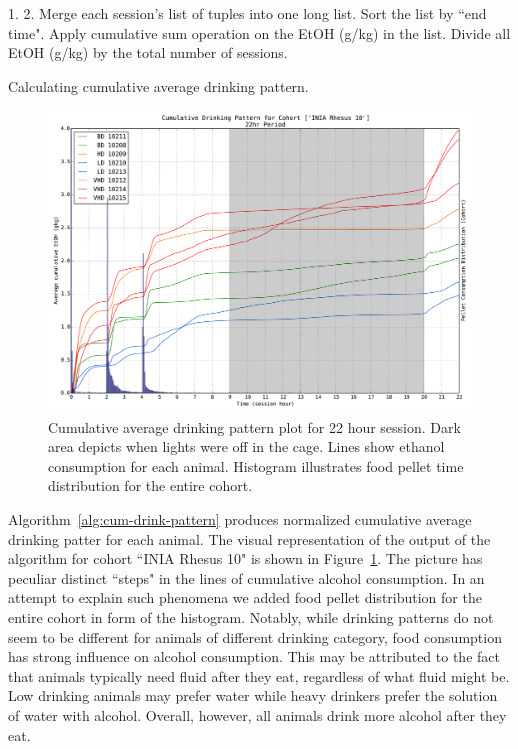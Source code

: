 	\begin{algorithm}[H]	%
		1. 
		2. Merge each session's list of tuples into one long list. Sort the list by ``end time". Apply cumulative sum operation on the EtOH (g/kg) in the list. Divide all EtOH (g/kg) by the total number of sessions.
	\caption{Calculating cumulative average drinking pattern.}
	\label{alg:cum-drink-pattern}
	\end{algorithm}
	
	\begin{figure}[ht]
		\centering
		\includegraphics[width=\linewidth]{figures/dp_r10_m_22hr.pdf}
		\caption{Cumulative average drinking pattern plot for 22 hour session. Dark area depicts when lights were off in the cage. Lines show ethanol consumption for each animal. Histogram illustrates food pellet time distribution for the entire cohort.}
		\label{fig:dp-22hr}
	\end{figure}
		
	Algorithm~\ref{alg:cum-drink-pattern} produces normalized cumulative average drinking patter for each animal. The visual representation of the output of the algorithm for cohort ``INIA Rhesus 10" is shown in Figure~\ref{fig:dp-22hr}. The picture has peculiar distinct ``steps" in the lines of cumulative alcohol consumption. In an attempt to explain such phenomena we added food pellet distribution for the entire cohort in form of the histogram. Notably, while drinking patterns do not seem to be different for animals of different drinking category, food consumption has strong influence on alcohol consumption. This may be attributed to the fact that animals typically need fluid after they eat, regardless of what fluid might be. Low drinking animals may prefer water while heavy drinkers prefer the solution of 
	water with alcohol. Overall, however, all animals drink more alcohol after they eat. 
	
